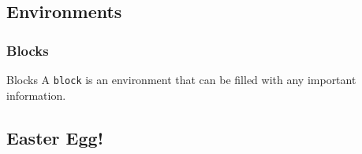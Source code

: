 \documentclass[10pt]{beamer}
\begin{document}
\subsection{Environments}
\begin{frame}
\frametitle{Blocks}

\begin{block}{Blocks}
A \texttt{block} is an environment that can be filled with any important information.\end{block}

\end{frame}

\subsection{Easter Egg!}
\end{document}
